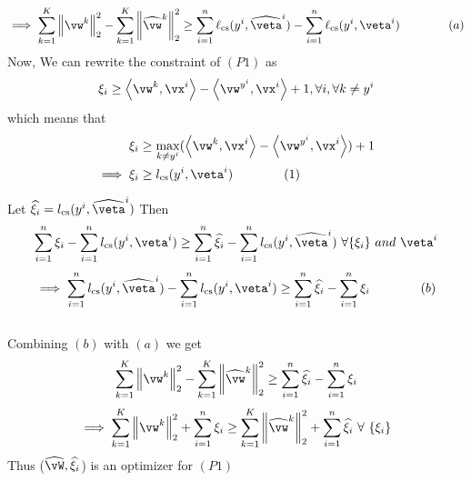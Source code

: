 \documentclass[a4paper,11pt]{article}
\begin{document}
\begin{mlsolution}
$$\implies  \sum_{k=1}^K\norm{\vw^k}_2^2 -\sum_{k=1}^K\norm{\widehat{\vw}^k}_2^2  \geq \sum_{i=1}^n\ell_\text{cs}(y^i,\widehat\veta^i) - \sum_{i=1}^n\ell_\text{cs}(y^i,\veta^i)\qquad\qquad{(a)} $$
\vspace{0.25cm}
Now, We can rewrite the constraint of $(P1)$ as 
\begin{equation*}
\xi_i  \geq \ip{\vw^k}{\vx^i} - \ip{\vw^{y^i}}{\vx^i}+ 1 , \forall i, \forall k \neq y^i\end{equation*}
which means that
\begin{align*}
\xi_i  & \geq \max_{k \neq y^i} (\ip{\vw^k}{\vx^i} - \ip{\vw^{y^i}}{\vx^i}) + 1\\
\implies \xi_i  & \geq l_\text{cs}(y^i,\veta^i)\qquad\qquad{(1)}
\end{align*}



Let $\widehat{\xi_i} =l_\text{cs}(y^i,\widehat\veta^i) $ Then
\begin{equation*}
\sum_{i=1}^n\xi_i - \sum_{i=1}^nl_\text{cs}(y^i,\veta^i) \geq \sum_{i=1}^n\widehat{\xi_i} - \sum_{i=1}^nl_\text{cs}(y^i,\widehat\veta^i) \ \forall \{\xi_i\}\ and \ \veta^i  
\end{equation*}
$$\implies \sum_{i=1}^nl_\text{cs}(y^i,\widehat\veta^i) - \sum_{i=1}^nl_\text{cs}(y^i,\veta^i) \geq \sum_{i=1}^n\widehat{\xi_i} - \sum_{i=1}^n\xi_i \qquad\qquad{(b)}$$\\
Combining $(b)$ with $(a)$ we get 
$$ \sum_{k=1}^K\norm{\vw^k}_2^2 -\sum_{k=1}^K\norm{\widehat{\vw}^k}_2^2 \geq \sum_{i=1}^n\widehat{\xi_i} - \sum_{i=1}^n\xi_i $$
$$\implies \sum_{k=1}^K\norm{\vw^k}_2^2 + \sum_{i=1}^n\xi_i \geq \sum_{k=1}^K\norm{\widehat{\vw}^k}_2^2 + \sum_{i=1}^n\widehat{\xi_i}  \ \forall\ \{\xi_i\}$$
Thus ($\widehat{\vW}, \widehat{\xi_i}$)  is an optimizer for $(P1)$

	
	



\end{mlsolution}
\end{document}
